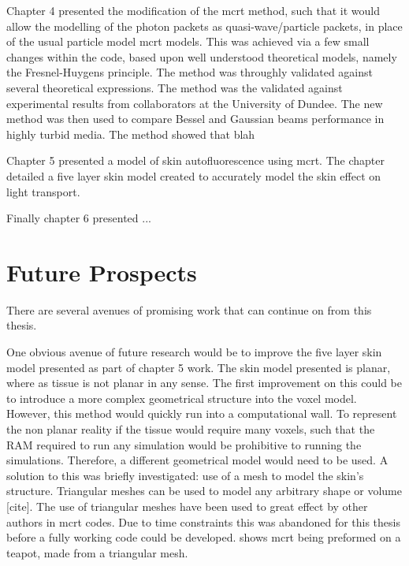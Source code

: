 \medskip

Chapter 4 presented the modification of the \gls*{mcrt} method, such that it would allow the modelling of the photon packets as quasi-wave/particle packets, in place of the usual particle model \gls*{mcrt} models.
This was achieved via a few small changes within the code, based upon well understood theoretical models, namely the Fresnel-Huygens principle.
The method was throughly validated against several theoretical expressions.
The method was the validated against experimental results from collaborators at the University of Dundee.
The new method was then used to compare Bessel and Gaussian beams performance in highly turbid media.
The method showed that blah

\medskip

Chapter 5 presented a model of skin autofluorescence using \gls*{mcrt}.
The chapter detailed a five layer skin model created to accurately model the skin effect on light transport.

\medskip

Finally chapter 6 presented ...

\section{Future Prospects}

There are several avenues of promising work that can continue on from this thesis.

One obvious avenue of future research would be to improve the five layer skin model presented as part of chapter 5 work.
The skin model presented is planar, where as tissue is not planar in any sense.
The first improvement on this could be to introduce a more complex geometrical structure into the voxel model.
However, this method would quickly run into a computational wall.
To represent the non planar reality if the tissue would require many voxels, such that the RAM required to run any simulation would be prohibitive to running the simulations.
Therefore, a different geometrical model would need to be used.
A solution to this was briefly investigated: use of a mesh to model the skin's structure.
Triangular meshes can be used to model any arbitrary shape or volume [cite].
The use of triangular meshes have been used to great effect by other authors in \gls*{mcrt} codes.
Due to time constraints this was abandoned for this thesis before a fully working code could be developed.
 shows \gls*{mcrt} being preformed on a teapot, made from a triangular mesh.

